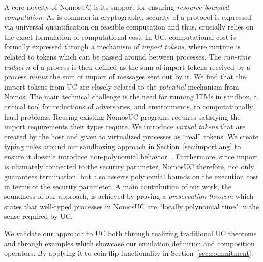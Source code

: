 A core novelty of NomosUC is its support for ensuring \emph{resource bounded computation}.
As is common in cryptography, security of a protocol is expressed via universal quantification
on feasible computation and thus, crucially relies on the exact formulation of computational cost.
In UC, computational cost is formally expressed through a mechanism of \emph{import tokens}, where runtime is related to tokens which can be passed around between processes.
The \emph{run-time budget} $n$ of a process is then defined as the sum of import tokens received by a process \emph{minus} the sum of import of messages sent out by it.
We find that the import tokens from UC are closely related to the \emph{potential} mechanism from Nomos.
The main technical challenge is the need for running ITMs in sandbox, a critical tool for reductions of adversaries, and environments, to computationally hard problems.
Reusing existing NomosUC programs requires satisfying the import requirements their types require.
We introduce \emph{virtual tokens} that are created by the host and given to virtualized processes as ``real'' tokens. 
We create typing rules around our sandboxing approach in Section~\ref{sec:importlang} to ensure it doesn't introduce non-polynomial behavior.
.
Furthermore, since import is ultimately connected to the security parameter, NomosUC
therefore, not only guarantees termination, but also asserts polynomial bounds on
the execution cost in terms of the security parameter.
A main contribution of our work, the soundness of our approach, is achieved by proving a \emph{preservation theorem}
which states that well-typed processes in NomosUC are ``locally polynomial time"
in the sense required by UC.

We validate our approach to UC both through realizing traditional UC theorems and through examples which showcase our emulation definition and composition operators.
By applying it to coin flip functionality \Fflip in Section~\ref{sec:commitment}.

